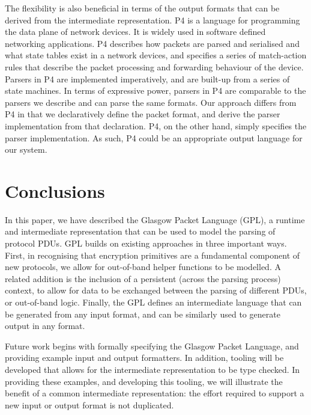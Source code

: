 \documentclass[10pt,sigconf]{acmart}
\begin{document}
The flexibility is also beneficial in terms of the output formats that can be derived from
the intermediate representation.
P4 \cite{bosshart:2014:p4,p4consortium:2018:v16spec-20180531} is a language
for programming the data plane of network devices. It is widely used in
software defined networking applications.
P4 describes how packets are parsed and serialised and what state tables
exist in a network devices, and specifies a series of match-action rules
that describe the packet processing and forwarding behaviour of the device.
Parsers in P4 are implemented imperatively, and are built-up from a series
of state machines.
In terms of expressive power, parsers in P4 are comparable to the parsers
we describe and can parse the same formats.
Our approach differs from P4 in that we declaratively define the packet
format, and derive the parser implementation from that declaration. P4,
on the other hand, simply specifies the parser implementation. As such,
P4 could be an appropriate output language for our system.

\section{Conclusions}
\label{sec:conclusion}

In this paper, we have described the Glasgow Packet Language (GPL), a runtime and
intermediate representation that can be used to model the parsing of protocol PDUs. GPL
builds on existing approaches in three important ways. First, in recognising that
encryption primitives are a fundamental component of new protocols, we allow for
out-of-band helper functions to be modelled. A related addition is the inclusion of a
persistent (across the parsing process) context, to allow for data to be exchanged between
the parsing of different PDUs, or out-of-band logic. Finally, the GPL defines an
intermediate language that can be generated from any input format, and can be similarly
used to generate output in any format.

Future work begins with formally specifying the Glasgow Packet Language, and providing
example input and output formatters. In addition, tooling will be developed that allows
for the intermediate representation to be type checked. In providing these examples, and
developing this tooling, we will illustrate the benefit of a common intermediate
representation: the effort required to support a new input or output format is not
duplicated.
\end{document}
